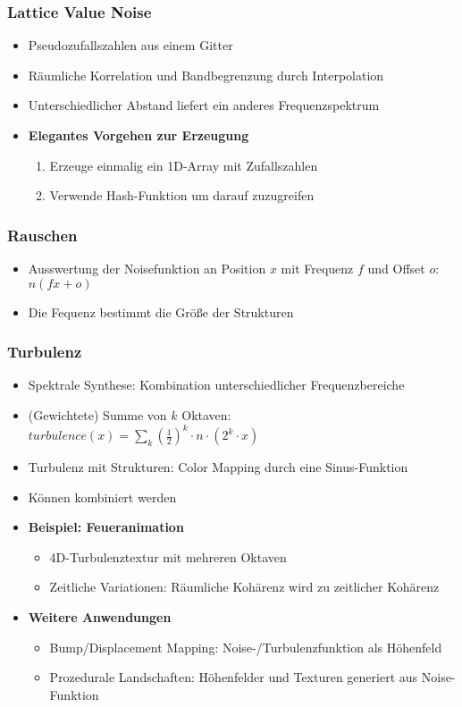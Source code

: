 \subsubsection{Lattice Value Noise}
\begin{itemize}
	\item Pseudozufallszahlen aus einem Gitter
	\item Räumliche Korrelation und Bandbegrenzung durch Interpolation
	\item Unterschiedlicher Abstand liefert ein anderes Frequenzspektrum
	\item \textbf{Elegantes Vorgehen zur Erzeugung}
	\begin{enumerate}
		\item Erzeuge einmalig ein 1D-Array mit Zufallszahlen
		\item Verwende Hash-Funktion um darauf zuzugreifen
	\end{enumerate}
\end{itemize}

\subsubsection{Rauschen}
\begin{itemize}
	\item Ausswertung der Noisefunktion an Position \(x\) mit Frequenz \(f\) und Offset \(o\): \(n(fx+o)\)
	\item Die Fequenz bestimmt die Größe der Strukturen
\end{itemize}

\subsubsection{Turbulenz}
\begin{itemize}
	\item Spektrale Synthese: Kombination unterschiedlicher Frequenzbereiche
	\item (Gewichtete) Summe von \(k\) Oktaven: \(turbulence(x) = \sum_k (\frac{1}{2})^k \cdot n \cdot (2^k\cdot x)\)
	\item Turbulenz mit Strukturen: Color Mapping durch eine Sinus-Funktion
	\item Können kombiniert werden
	\item \textbf{Beispiel: Feueranimation}
	\begin{itemize}
		\item 4D-Turbulenztextur mit mehreren Oktaven
		\item Zeitliche Variationen: Räumliche Kohärenz wird zu zeitlicher Kohärenz
	\end{itemize}
	\item \textbf{Weitere Anwendungen}
	\begin{itemize}
		\item Bump/Displacement Mapping: Noise-/Turbulenzfunktion als Höhenfeld
		\item Prozedurale Landschaften: Höhenfelder und Texturen generiert aus Noise-Funktion
	\end{itemize}
\end{itemize}


